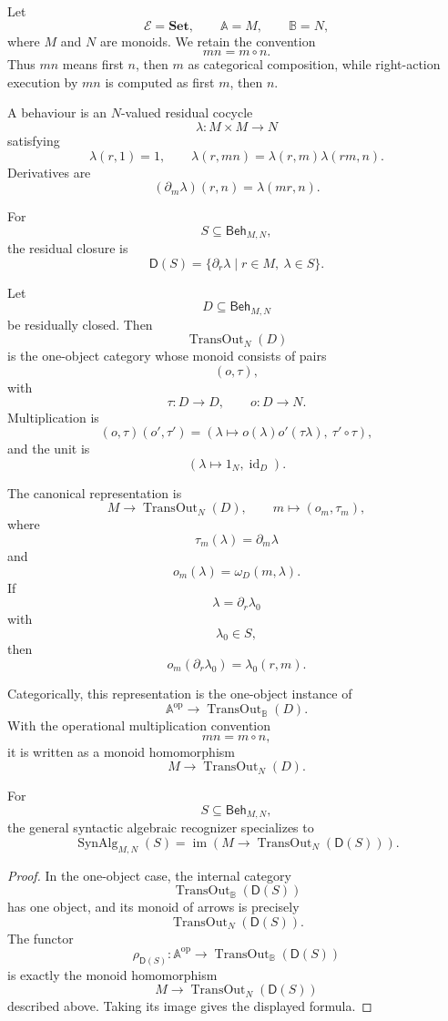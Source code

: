 Let
\[
\mathcal E=\mathbf{Set},
\qquad
\mathbb A=M,
\qquad
\mathbb B=N,
\]
where \(M\) and \(N\) are monoids. We retain the convention
\[
mn=m\circ n.
\]
Thus \(mn\) means first \(n\), then \(m\) as categorical composition, while
right-action execution by \(mn\) is computed as first \(m\), then \(n\).

A behaviour is an \(N\)-valued residual cocycle
\[
\lambda:M\times M\to N
\]
satisfying
\[
\lambda(r,1)=1,
\qquad
\lambda(r,mn)=\lambda(r,m)\lambda(rm,n).
\]
Derivatives are
\[
(\partial_m\lambda)(r,n)=\lambda(mr,n).
\]

For
\[
S\subseteq\mathsf{Beh}_{M,N},
\]
the residual closure is
\[
\mathsf D(S)
=
\{\partial_r\lambda\mid r\in M,\ \lambda\in S\}.
\]

Let
\[
D\subseteq\mathsf{Beh}_{M,N}
\]
be residually closed. Then
\[
\operatorname{TransOut}_{N}(D)
\]
is the one-object category whose monoid consists of pairs
\[
(o,\tau),
\]
with
\[
\tau:D\to D,
\qquad
o:D\to N.
\]
Multiplication is
\[
(o,\tau)(o',\tau')
=
\left(
\lambda\mapsto o(\lambda)o'(\tau\lambda),
\ \tau'\circ\tau
\right),
\]
and the unit is
\[
(\lambda\mapsto 1_N,\operatorname{id}_D).
\]

The canonical representation is
\[
M\to \operatorname{TransOut}_N(D),
\qquad
m\longmapsto(o_m,\tau_m),
\]
where
\[
\tau_m(\lambda)=\partial_m\lambda
\]
and
\[
o_m(\lambda)=\omega_D(m,\lambda).
\]
If
\[
\lambda=\partial_r\lambda_0
\]
with
\[
\lambda_0\in S,
\]
then
\[
o_m(\partial_r\lambda_0)=\lambda_0(r,m).
\]

Categorically, this representation is the one-object instance of
\[
\mathbb A^{\mathrm{op}}
\to
\operatorname{TransOut}_{\mathbb B}(D).
\]
With the operational multiplication convention
\[
mn=m\circ n,
\]
it is written as a monoid homomorphism
\[
M\to\operatorname{TransOut}_N(D).
\]

\begin{proposition}
\label{prop:eilenberg-one-object-synalg}
For
\[
S\subseteq\mathsf{Beh}_{M,N},
\]
the general syntactic algebraic recognizer specializes to
\[
\operatorname{SynAlg}_{M,N}(S)
=
\operatorname{im}
\left(
M\to
\operatorname{TransOut}_N(\mathsf D(S))
\right).
\]
\end{proposition}

\begin{proof}
In the one-object case, the internal category
\[
\operatorname{TransOut}_{\mathbb B}(\mathsf D(S))
\]
has one object, and its monoid of arrows is precisely
\[
\operatorname{TransOut}_N(\mathsf D(S)).
\]
The functor
\[
\rho_{\mathsf D(S)}:
\mathbb A^{\mathrm{op}}\to
\operatorname{TransOut}_{\mathbb B}(\mathsf D(S))
\]
is exactly the monoid homomorphism
\[
M\to
\operatorname{TransOut}_N(\mathsf D(S))
\]
described above. Taking its image gives the displayed formula.
\end{proof}

